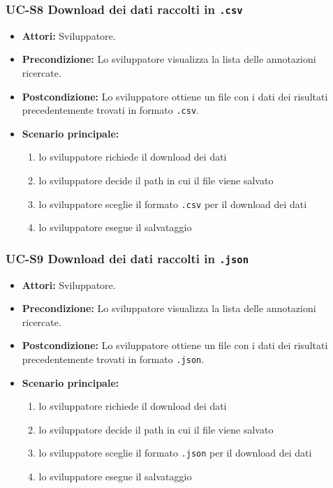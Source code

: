 \subsubsection{UC-S8 Download dei dati raccolti in \texttt{.csv}}
		\begin{itemize}
			\item \textbf{Attori:} Sviluppatore.
			\item \textbf{Precondizione:} Lo sviluppatore visualizza la lista delle annotazioni ricercate.
			\item \textbf{Postcondizione:} Lo sviluppatore ottiene un file con i dati dei risultati precedentemente trovati in formato \texttt{.csv}.
			\item \textbf{Scenario principale:}
				\begin{enumerate}
					\item lo sviluppatore richiede il download dei dati
					\item lo sviluppatore decide il path in cui il file viene salvato
					\item lo sviluppatore sceglie il formato \texttt{.csv} per il download dei dati
					\item lo sviluppatore esegue il salvataggio
				\end{enumerate}
		\end{itemize}

\subsubsection{UC-S9 Download dei dati raccolti in \texttt{.json}}
		\begin{itemize}
			\item \textbf{Attori:} Sviluppatore.
			\item \textbf{Precondizione:} Lo sviluppatore visualizza la lista delle annotazioni ricercate.
			\item \textbf{Postcondizione:} Lo sviluppatore ottiene un file con i dati dei risultati precedentemente trovati in formato \texttt{.json}.
			\item \textbf{Scenario principale:}
				\begin{enumerate}
					\item lo sviluppatore richiede il download dei dati
					\item lo sviluppatore decide il path in cui il file viene salvato
					\item lo sviluppatore sceglie il formato \texttt{.json} per il download dei dati
					\item lo sviluppatore esegue il salvataggio
				\end{enumerate}
		\end{itemize}

